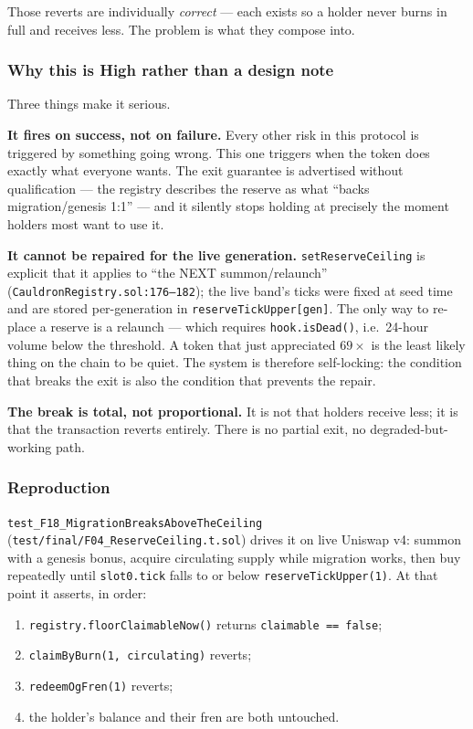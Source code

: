 \documentclass[11pt,a4paper]{article}
\newcommand{\code}[1]{\texttt{\small #1}}
\newcommand{\fileref}[1]{\texttt{\scriptsize #1}}
\begin{document}
Those reverts are individually \emph{correct} --- each exists so a holder never
burns in full and receives less. The problem is what they compose into.

\subsubsection*{Why this is High rather than a design note}

Three things make it serious.

\textbf{It fires on success, not on failure.} Every other risk in this protocol is
triggered by something going wrong. This one triggers when the token does exactly
what everyone wants. The exit guarantee is advertised without qualification --- the
registry describes the reserve as what ``backs migration/genesis 1:1'' --- and it
silently stops holding at precisely the moment holders most want to use it.

\textbf{It cannot be repaired for the live generation.}
\code{setReserveCeiling} is explicit that it applies to ``the NEXT summon/relaunch''
(\fileref{CauldronRegistry.sol:176--182}); the live band's ticks were fixed at
seed time and are stored per-generation in \code{reserveTickUpper[gen]}. The only
way to re-place a reserve is a relaunch --- which requires \code{hook.isDead()},
i.e.\ 24-hour volume below the threshold. A token that just appreciated
$69\times$ is the least likely thing on the chain to be quiet. The system is
therefore self-locking: the condition that breaks the exit is also the condition
that prevents the repair.

\textbf{The break is total, not proportional.} It is not that holders receive less;
it is that the transaction reverts entirely. There is no partial exit, no
degraded-but-working path.

\subsubsection*{Reproduction}

\code{test\_F18\_MigrationBreaksAboveTheCeiling}
(\fileref{test/final/F04\_ReserveCeiling.t.sol}) drives it on live Uniswap v4:
summon with a genesis bonus, acquire circulating supply while migration works, then
buy repeatedly until \code{slot0.tick} falls to or below
\code{reserveTickUpper(1)}. At that point it asserts, in order:

\begin{enumerate}
\item \code{registry.floorClaimableNow()} returns \code{claimable == false};
\item \code{claimByBurn(1, circulating)} reverts;
\item \code{redeemOgFren(1)} reverts;
\item the holder's balance and their fren are both untouched.
\end{enumerate}
\end{document}
